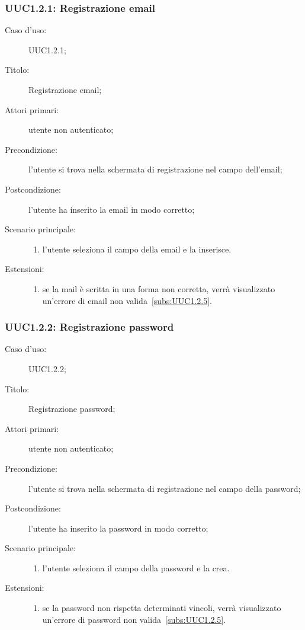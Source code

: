 \documentclass[../../../analisi-dei-requisiti.tex]{subfiles}
\begin{document}
\subsubsection{UUC1.2.1: Registrazione email}%
\label{subs:UUC1.2.1}
\begin{description}
  \item[Caso d’uso:] UUC1.2.1;
  \item[Titolo:] Registrazione email;
  \item[Attori primari:] utente non autenticato;
  \item[Precondizione:] l'utente si trova nella schermata di registrazione nel campo dell'email;
  \item[Postcondizione:] l'utente ha inserito la email in modo corretto;
  \item[Scenario principale:]
  \begin{enumerate}
    \item l'utente seleziona il campo della email e la inserisce.
  \end{enumerate}
  \item[Estensioni:]
  \begin{enumerate}
    \item se la mail è scritta in una forma non corretta, verrà visualizzato un'errore di email non valida~\ref{subs:UUC1.2.5}.
  \end{enumerate}
\end{description}



\subsubsection{UUC1.2.2: Registrazione password}%
\label{subs:UUC1.2.2}
\begin{description}
  \item[Caso d’uso:] UUC1.2.2;
  \item[Titolo:] Registrazione password;
  \item[Attori primari:] utente non autenticato;
  \item[Precondizione:] l'utente si trova nella schermata di registrazione nel campo della password;
  \item[Postcondizione:] l'utente ha inserito la password in modo corretto;
  \item[Scenario principale:]
  \begin{enumerate}
    \item l'utente seleziona il campo della password e la crea.
  \end{enumerate}
  \item[Estensioni:]
  \begin{enumerate}
    \item se la password non rispetta determinati vincoli, verrà visualizzato un'errore di password non valida~\ref{subs:UUC1.2.5}.
  \end{enumerate}
\end{description}
\end{document}
